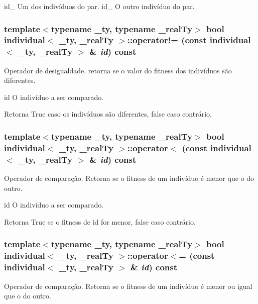 id\_ Um dos indivíduos do par.  id\_ O outro indivíduo do par. \hypertarget{classindividual_a354f288f25fd01c842c91eba334cbc62}{
\subsubsection[{operator!=}]{\setlength{\rightskip}{0pt plus 5cm}template$<$typename \_\-ty, typename \_\-realTy$>$ bool {\bf individual}$<$ \_\-ty, \_\-realTy $>$::operator!= (const {\bf individual}$<$ \_\-ty, \_\-realTy $>$ \& {\em id}) const}}
\label{classindividual_a354f288f25fd01c842c91eba334cbc62}
Operador de desigualdade. retorna se o valor do fitness dos indivíduos são diferentes.

id O indivíduo a ser comparado.

\begin{DoxyReturn}{Retorna}
True caso os indivíduos são diferentes, false caso contrário. 
\end{DoxyReturn}
\hypertarget{classindividual_a33af2ec8a3a483ddd5e188959a20f22b}{
\subsubsection[{operator$<$}]{\setlength{\rightskip}{0pt plus 5cm}template$<$typename \_\-ty, typename \_\-realTy$>$ bool {\bf individual}$<$ \_\-ty, \_\-realTy $>$::operator$<$ (const {\bf individual}$<$ \_\-ty, \_\-realTy $>$ \& {\em id}) const}}
\label{classindividual_a33af2ec8a3a483ddd5e188959a20f22b}
Operador de comparação. Retorna se o fitness de um indivíduo é menor que o do outro.

id O indivíduo a ser comparado.

\begin{DoxyReturn}{Retorna}
True se o fitness de id for menor, false caso contrário. 
\end{DoxyReturn}
\hypertarget{classindividual_a5fd9597a7c5dc2308535236c314d85e6}{
\subsubsection[{operator$<$=}]{\setlength{\rightskip}{0pt plus 5cm}template$<$typename \_\-ty, typename \_\-realTy$>$ bool {\bf individual}$<$ \_\-ty, \_\-realTy $>$::operator$<$= (const {\bf individual}$<$ \_\-ty, \_\-realTy $>$ \& {\em id}) const}}
\label{classindividual_a5fd9597a7c5dc2308535236c314d85e6}
Operador de comparação. Retorna se o fitness de um indivíduo é menor ou igual que o do outro.

